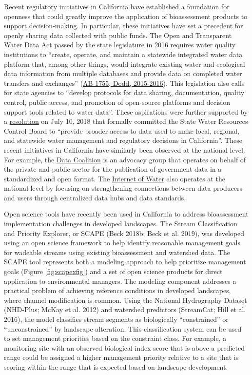 \documentclass[fleqn,10pt,lineno]{wlpeerj} %
\begin{document}
Recent regulatory initiatives in California have established a foundation for openness that could greatly improve the application of bioassessment products to support decision-making. In particular, these initiatives have set a precedent for openly sharing data collected with public funds. The Open and Transparent Water Data Act passed by the state legislature in 2016 requires water quality institutions to ``create, operate, and maintain a statewide integrated water data platform that, among other things, would integrate existing water and ecological data information from multiple databases and provide data on completed water transfers and exchanges'' (\href{https://leginfo.legislature.ca.gov/faces/billNavClient.xhtml?bill_id=201520160AB1755}{AB 1755, Dodd, 2015-2016}). This legislation also calls for state agencies to ``develop protocols for data sharing, documentation, quality control, public access, and promotion of open-source platforms and decision support tools related to water data''. These aspirations were further supported by a \href{https://www.waterboards.ca.gov/press_room/press_releases/2018/pr_water_data_071018.pdf}{resolution} on July 10, 2018 that formally committed the State Water Resources Control Board to ``provide broader access to data used to make local, regional, and statewide water management and regulatory decisions in California''. These recent initiatives in California have similarly been observed at the national level. For example, the \href{https://www.datacoalition.org/}{Data Coalition} is an advocacy group that operates on behalf of the private and public sector for the publication of government data in a standardized and open format. The \href{https://internetofwater.org/}{Internet of Water} also operates at the national-level by focusing on strengthening connections between data producers and users through centralized data hubs and data standards.

Open science tools have recently been used in California to address bioassessment implementation challenges in developed landscapes. The Stream Classification and Priority Explorer, or SCAPE (Beck 2018b; Beck et al. 2019), was developed using an open science framework to help identify reasonable management goals for wadeable streams using existing bioassessment and watershed data. The SCAPE tool represents both a modeling approach to help prioritize management goals (Figure \ref{fig:scapexfig}) and a set of open science products for direct application to environmental managers. The modeling component addresses a practical problem of achieving reference conditions in developed landscapes, where channel modification is common. Using the National Hydrography Dataset (NHD-Plus; McKay et al. 2012) and watershed predictors (StreamCat; Hill et al. 2016), the model classifies stream segments as biologically ``constrained'' or ``unconstrained'' by landscape alteration. This classification system can be used to set management priorities based on the constraint class. For example, a monitoring site with an observed biological index score that is above a predicted range could be assigned a higher management priority relative to a site that is scoring within the range that is expected based on landscape development.
\end{document}
